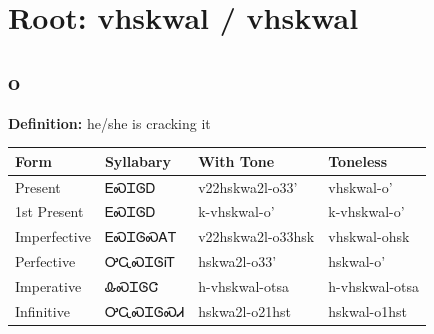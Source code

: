 \documentclass{article}%
\begin{document}
%
\normalsize%
\section*{Root: vhskwal / vhskwal}%
\subsection*{o}%
\textbf{Definition: }%
he/she is cracking it%
\\[0.5em]%
\begin{tabular}{|l|l|l|l|}%
\hline%
\textbf{Form}&\textbf{Syllabary}&\textbf{With Tone}&\textbf{Toneless}\\%
\hline%
Present&ᎬᏍᏆᎶᎠ&v22hskwa2l{-}o33'&vhskwal{-}o'\\%
1st Present&ᎬᏍᏆᎶᎠ&k{-}vhskwal{-}o'&k{-}vhskwal{-}o'\\%
Imperfective&ᎬᏍᏆᎶᏍᎪᎢ&v22hskwa2l{-}o33hsk&vhskwal{-}ohsk\\%
Perfective&ᎤᏩᏍᏆᎶᎥᎢ&hskwa2l{-}o33'&hskwal{-}o'\\%
Imperative&ᎲᏍᏆᎶᏣ&h{-}vhskwal{-}otsa&h{-}vhskwal{-}otsa\\%
Infinitive&ᎤᏩᏍᏆᎶᏍᏗ&hskwa2l{-}o21hst&hskwal{-}o1hst\\%
\hline%
\end{tabular}%
\\[1em]%
\end{document}

